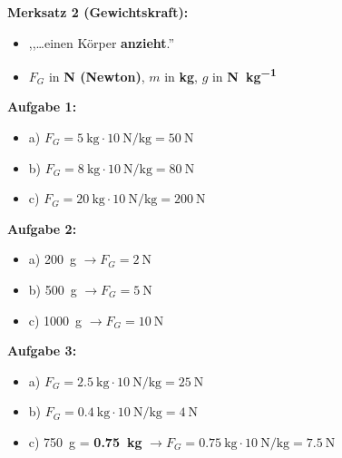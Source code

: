 \documentclass[a4paper,11pt]{article}
\begin{document}
\vspace{3mm}

\textbf{Merksatz 2 (Gewichtskraft):}
\begin{itemize}[nosep]
    \item ,,\ldots einen Körper \textbf{anzieht}.''
    \item $F_G$ in \textbf{\si{\newton} (Newton)}, $m$ in \textbf{\si{\kilogram}}, $g$ in \textbf{\si{\newton\per\kilogram}}
\end{itemize}

\vspace{3mm}

\textbf{Aufgabe 1:}
\begin{itemize}[nosep]
    \item a) $F_G = \SI{5}{\kilogram} \cdot \SI{10}{\newton\per\kilogram} = \SI{50}{\newton}$
    \item b) $F_G = \SI{8}{\kilogram} \cdot \SI{10}{\newton\per\kilogram} = \SI{80}{\newton}$
    \item c) $F_G = \SI{20}{\kilogram} \cdot \SI{10}{\newton\per\kilogram} = \SI{200}{\newton}$
\end{itemize}

\vspace{3mm}

\textbf{Aufgabe 2:}
\begin{itemize}[nosep]
    \item a) \SI{200}{\gram} $\rightarrow F_G = \SI{2}{\newton}$
    \item b) \SI{500}{\gram} $\rightarrow F_G = \SI{5}{\newton}$
    \item c) \SI{1000}{\gram} $\rightarrow F_G = \SI{10}{\newton}$
\end{itemize}

\vspace{3mm}

\textbf{Aufgabe 3:}
\begin{itemize}[nosep]
    \item a) $F_G = \SI{2,5}{\kilogram} \cdot \SI{10}{\newton\per\kilogram} = \SI{25}{\newton}$
    \item b) $F_G = \SI{0,4}{\kilogram} \cdot \SI{10}{\newton\per\kilogram} = \SI{4}{\newton}$
    \item c) \SI{750}{\gram} = \textbf{\SI{0,75}{\kilogram}} $\rightarrow F_G = \SI{0,75}{\kilogram} \cdot \SI{10}{\newton\per\kilogram} = \SI{7,5}{\newton}$
\end{itemize}

\vspace{3mm}
\end{document}
